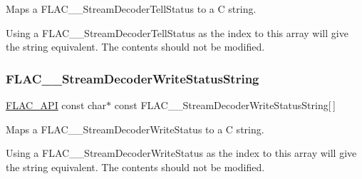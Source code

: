 Maps a F\+L\+A\+C\+\_\+\+\_\+\+Stream\+Decoder\+Tell\+Status to a C string.

Using a F\+L\+A\+C\+\_\+\+\_\+\+Stream\+Decoder\+Tell\+Status as the index to this array will give the string equivalent. The contents should not be modified. \mbox{\label{group__flac__stream__decoder_gae0c0c4f29a8524aedc58778504923297}} 
\subsubsection{\texorpdfstring{FLAC\_\_StreamDecoderWriteStatusString}{FLAC\_\_StreamDecoderWriteStatusString}}
{\footnotesize\ttfamily \mbox{\hyperlink{group__flac__export_ga56ca07df8a23310707732b1c0007d6f5}{F\+L\+A\+C\+\_\+\+A\+PI}} const char$\ast$ const F\+L\+A\+C\+\_\+\+\_\+\+Stream\+Decoder\+Write\+Status\+String\mbox{[}$\,$\mbox{]}}

Maps a F\+L\+A\+C\+\_\+\+\_\+\+Stream\+Decoder\+Write\+Status to a C string.

Using a F\+L\+A\+C\+\_\+\+\_\+\+Stream\+Decoder\+Write\+Status as the index to this array will give the string equivalent. The contents should not be modified. 